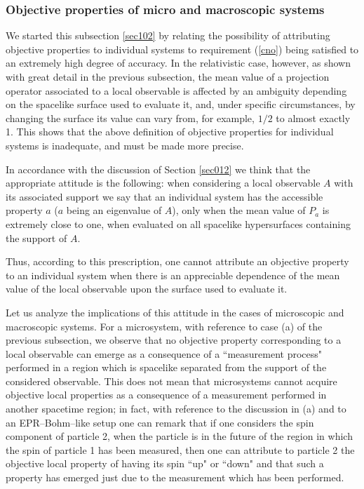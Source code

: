 \documentclass[12pt]{article}
\begin{document}
\subsubsection{Objective properties of micro and macroscopic systems}
\label{sec1024}

We started this subsection \ref{sec102} by relating the
possibility of attributing objective properties to individual
systems to requirement (\ref{cno}) being satisfied to an extremely
high degree of accuracy. In the relativistic case, however, as
shown with great detail in the previous subsection, the mean value
of a projection operator associated to a local observable is
affected by an ambiguity depending on the spacelike surface used
to evaluate it, and, under specific circumstances, by changing the
surface its value can vary from, for example, $1/2$ to almost
exactly 1. This shows that the above definition of objective
properties for individual systems is inadequate, and must be made
more precise.

In accordance with the discussion of Section \ref{sec012} we think that
the appropriate attitude is the following: when considering a local
observable $A$ with its associated support we say that an individual
system has the accessible property $a$ ($a$ being an eigenvalue of $A$),
only when the mean value of $P_{a}$ is extremely close to one, when
evaluated on all spacelike hypersurfaces containing the support of $A$.

Thus, according to this prescription, one cannot attribute an
objective property to an individual system when there is an
appreciable dependence of the mean value of the local observable
upon the surface used to evaluate it.

Let us analyze the implications of this attitude in the cases of
microscopic and macroscopic systems. For a microsystem, with
reference to case (a) of the previous subsection, we observe that
no objective property corresponding to a local observable can
emerge as a consequence of a ``measurement process" performed in a
region which is spacelike separated from the support of the
considered observable. This does not mean that microsystems cannot
acquire objective local properties as a consequence of a
measurement performed in another spacetime region; in fact, with
reference to the discussion in (a) and to an EPR--Bohm--like setup
one can remark that if one considers the spin component of
particle 2, when the particle is in the future of the region in
which the spin of particle 1 has been measured, then one can
attribute to particle 2 the objective local property of having its
spin ``up" or ``down" and that such a property has emerged just
due to the measurement which has been performed.
\end{document}
